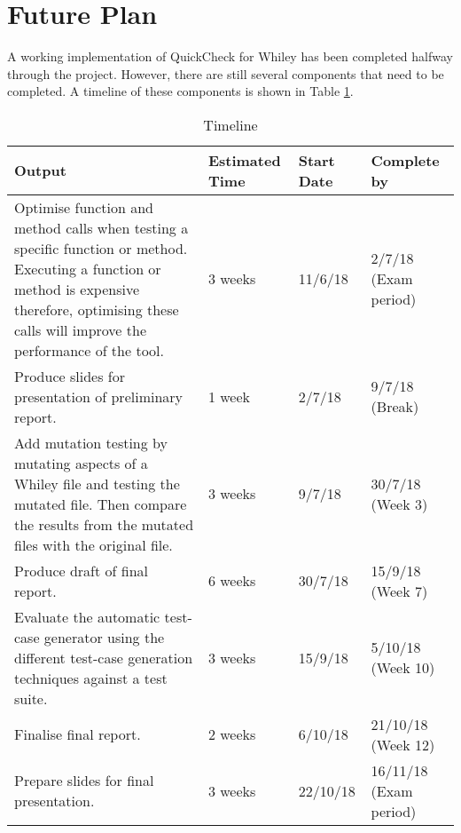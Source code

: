 \section{Future Plan}\label{section:future}


A working implementation of QuickCheck for Whiley has been completed halfway through the project. However, there are still several components that need to be completed.
A timeline of these components is shown in Table \ref{table:timeline}.

\begin{table}[H]
	  \centering
\begin{tabular}{ |p{10cm}|p{2cm}|p{2cm}|p{2cm}| }
\hline
\textbf{Output} & \textbf{Estimated Time} & \textbf{Start Date} & \textbf{Complete by}\\
\hline
Optimise function and method calls when testing a specific function or method. Executing a function or method is expensive therefore, optimising these calls will improve the performance of the tool. & 3 weeks & 11/6/18 & 2/7/18 (Exam period) \\
\hline
Produce slides for presentation of preliminary report. & 1 week & 2/7/18 & 9/7/18 (Break)\\
\hline
Add mutation testing by mutating aspects of a Whiley file and testing the mutated file. Then compare the results from the mutated files with the original file. & 3 weeks & 9/7/18 & 30/7/18 (Week 3)\\
\hline
Produce draft of final report. & 6 weeks & 30/7/18 & 15/9/18 (Week 7)\\
\hline
Evaluate the automatic test-case generator using the different test-case generation techniques against a test suite. & 3 weeks & 15/9/18 & 5/10/18 (Week 10) \\
\hline
Finalise final report. & 2 weeks & 6/10/18 & 21/10/18 (Week 12) \\
\hline
Prepare slides for final presentation. & 3 weeks & 22/10/18 & 16/11/18 (Exam period)\\
\hline
\end{tabular}

\caption{Timeline}
\label{table:timeline}

\end{table}

